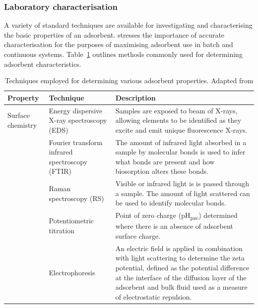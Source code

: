 \subsubsection{Laboratory characterisation}

A variety of standard techniques are available for investigating and characterising the basic properties of an adsorbent. \textcite{Unuabonah2019} stresses the importance of accurate characterisation for the purposes of maximising adsorbent use in batch and continuous systems. Table~\ref{tab:techniques} outlines methods commonly used for determining adsorbent characteristics.

\setlength{\extrarowheight}{0.2cm}
\begin{small}
\begin{longtable}{>{\raggedright\arraybackslash}p{2.5cm}>{\raggedright\arraybackslash}p{3cm}p{7cm}}
	
	\caption{Techniques employed for determining various adsorbent properties. Adapted from \textcite{Tran2017}}
	\label{tab:techniques} \\

	
	\toprule
	Property  & Technique & Description \\
	\toprule
	\endhead
	
	\bottomrule
	\endfoot
	
	Surface chemistry & Energy dispersive  X-ray spectroscopy (EDS) & Samples are exposed to beam of X-rays, allowing elements to be identified as they excite and emit unique fluorescence X-rays.  \\ 
	& Fourier transform infrared spectroscopy (FTIR) & The amount of infrared light absorbed in a sample by molecular bonds is used to infer what bonds are present and how biosorption alters these bonds. \\ 
	& Raman spectroscopy (RS) & Visible or infrared light is is passed through a sample. The amount of light scattered can be used to identify molecular bonds. \\ 
	& Potentiometric titration & Point of zero charge (pH\textsubscript{pzc})  determined where there is an absence of adsorbent surface charge. \\ 
	& Electrophoresis & An electric field is applied in combination with light scattering to determine the zeta potential, defined as the potential difference at the interface of the diffusion layer of the adsorbent and bulk fluid used as a measure of electrostatic repulsion. \\ 
	

\end{longtable}
\end{small}
